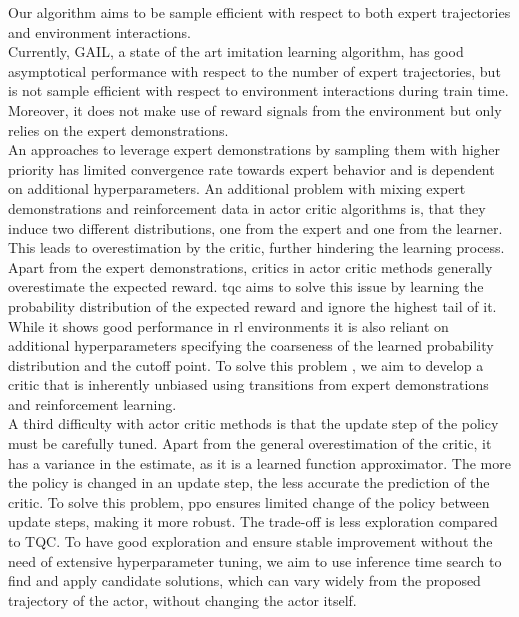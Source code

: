 Our algorithm aims to be sample efficient with respect to both expert trajectories and environment interactions. \\

Currently, GAIL, a state of the art imitation learning algorithm, has good asymptotical performance with respect to the number of expert trajectories, but is not sample efficient 
with respect to environment interactions during train time. Moreover, it does not make use of reward signals from the environment but only relies on the expert demonstrations.\\ 

An approaches to leverage expert demonstrations by sampling them with higher priority \cite{vecerik2018leveraging} has limited convergence rate towards expert behavior and is dependent on additional hyperparameters. 
An additional problem with mixing expert demonstrations and reinforcement data in actor critic algorithms is, that they induce two different distributions, one from the expert and one from 
the learner. This leads to overestimation by the critic, further hindering the learning process. \\

Apart from the expert demonstrations, critics in actor critic methods generally overestimate the expected reward. \ac{tqc} \cite{TQC_Paper} aims to solve this issue by learning the 
probability distribution of the expected reward and ignore the highest tail of it. While it shows good performance in \ac{rl} environments 
it is also reliant on additional hyperparameters 
specifying the coarseness of the learned probability distribution and the cutoff point. To solve this problem , we aim to develop a critic that is inherently unbiased using transitions from expert demonstrations 
and reinforcement learning.\\

A third difficulty with actor critic methods is that the update step of the policy must be carefully tuned. Apart from the general overestimation of the critic, it has a variance in the estimate, 
as it is a learned function approximator. The more the policy is changed in an update step, the less accurate the prediction of the critic. To solve this problem, \ac{ppo} ensures limited change of the policy 
between update steps, making it more robust. The trade-off is less exploration compared to TQC. To have good exploration 
and ensure stable improvement without the need of extensive hyperparameter tuning, we aim to use inference time search to find and apply candidate solutions, which can vary widely from the 
proposed trajectory of the actor, without changing the actor itself. \\

